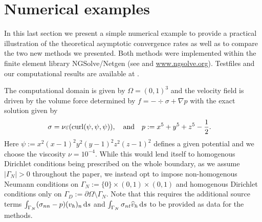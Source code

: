 \section{Numerical examples}\label{sec::numex}

In this last section we present a simple numerical example to provide
a practical illustration of the theoretical asymptotic convergence
rates as well as to compare the two new methods we presented.  Both
methods were implemented within the finite element library
NGSolve/Netgen (see \cite{netgen,schoeberl2014cpp11} and
\url{www.ngsolve.org}). Testfiles and our computational results
are available at \cite{philip_lederer_2023_7767775}.

The computational domain is given by $\Omega = (0,1)^3$ and the
velocity field is driven by the volume force determined by $f =
-\div \sigma  + \nabla p$ with the exact solution given by
\begin{align*}
  \sigma &= \nu\varepsilon(\operatorname{curl}(\psi,\psi,\psi)), \quad \textrm{and} \quad  p := x^5 + y^5 +z^5 - \frac{1}{2}.                              
\end{align*}
Here $\psi :=x^2(x-1)^2y^2(y-1)^2z^2(z-1)^2$ defines a given potential
and we choose the viscosity $\nu = 10^{-4}$.
While this would lend itself to homogenous Dirichlet conditions being prescribed on the
whole boundary, as we assume $|\Gamma_N|>0$ throughout the paper, we instead opt
to impose non-homogenous Neumann conditions on $\Gamma_N:=\{0\}\times(0,1)\times(0,1)$
and homogenous Dirichlet conditions only on $\Gamma_D:=\partial\Omega\setminus\Gamma_N$.
Note that this requires the additional source terms $\int_{\Gamma_N}(\sigma_{nn} - p) (v_h)_n\mathop{\mathrm{d} s}$
and $\int_{\Gamma_N}\sigma_{nt}\widehat{v}_h\mathop{\mathrm{d} s}$ to be provided as data for the methods.

